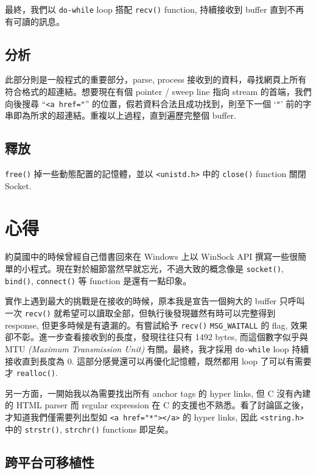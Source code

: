 \documentclass[12pt, a4paper]{article}
\begin{document}
最終，我們以 \texttt{do-while} loop 搭配 \texttt{recv()} function, 持續接收到 buffer 直到不再有可讀的訊息。

\subsection{分析}

此部分則是一般程式的重要部分，parse, process 接收到的資料，尋找網頁上所有符合格式的超連結。想要現在有個 pointer / sweep line 指向 stream 的首端，我們向後搜尋 ``\texttt{<a href="}'' 的位置，假若資料合法且成功找到，則至下一個 `\texttt{"}' 前的字串即為所求的超連結。重複以上過程，直到遍歷完整個 buffer.

\subsection{釋放}

\texttt{free()} 掉一些動態配置的記憶體，並以 \texttt{<unistd.h>} 中的 \texttt{close()} function 關閉 \textsf{Socket}.

\section{心得}

約莫國中的時候曾經自己借書回來在 Windows 上以 \textsf{WinSock} API 撰寫一些很簡單的小程式。現在對於細節當然早就忘光，不過大致的概念像是 \texttt{socket()}, \texttt{bind()}, \texttt{connect()} 等 function 是還有一點印象。

實作上遇到最大的挑戰是在接收的時候，原本我是宣告一個夠大的 buffer 只呼叫一次 \texttt{recv()} 就希望可以讀取全部，但執行後發現雖然有時可以完整得到 response, 但更多時候是有遺漏的。有嘗試給予 \texttt{recv()} \texttt{MSG\_WAITALL} 的 flag, 效果卻不彰。進一步查看接收到的長度，發現往往只有 1492 bytes, 而這個數字似乎與 MTU \textit{(Maximum Transmission Unit)} 有關。最終，我才採用 \texttt{do-while} loop 持續接收直到長度為 0. 這部分感覺還可以再優化記憶體，既然都用 loop 了可以有需要才 \texttt{realloc()}.

另一方面，一開始我以為需要找出所有 anchor tags 的 hyper links, 但 C 沒有內建的 \textsf{HTML} parser 而 \textsf{regular expression} 在 C 的支援也不熟悉。看了討論區之後，才知道我們僅需要列出型如 \texttt{<a href="*"></a>} 的 hyper links, 因此 \texttt{<string.h>} 中的 \texttt{strstr()}, \texttt{strchr()} functions 即足矣。

\subsection{跨平台可移植性}
\end{document}
